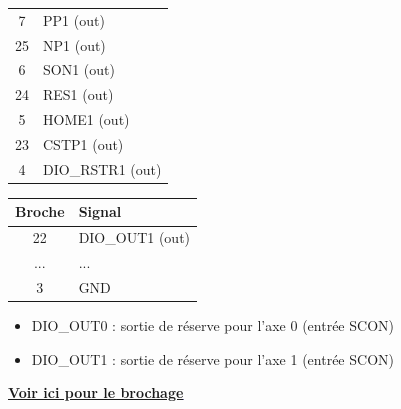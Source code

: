 \documentclass[a4paper,11pt]{beamer}
\begin{document}
\begin{frame}
\begin{table}[htbp]
\begin{tabular}[t]{cl}
    7 & PP1 (out) \\
    25 & NP1 (out)\\
    6 & SON1 (out)\\
    24 & RES1 (out)\\
    5  & HOME1 (out)\\
    23 & CSTP1 (out)\\ 
    4 & DIO\_RSTR1 (out)\\
    \bottomrule
  \end{tabular}
  \hspace{1mm}
  \begin{tabular}[t]{cl}
  \toprule
    \textbf{Broche} & \textbf{Signal} \\
    \midrule
  22 & DIO\_OUT1 (out)\\
    ...			&...\\
    3  & GND \\
    \bottomrule
  \end{tabular}
\end{table}
\begin{itemize}
\tiny
\item DIO\_OUT0 : sortie de réserve pour l'axe 0 (entrée SCON)
\item DIO\_OUT1 : sortie de réserve pour l'axe 1 (entrée SCON)
\end{itemize}
\vspace{0.5cm}
\centering
\textcolor{blue}{\textbf{\underline{\href{https://raw.githubusercontent.com/fbuloup/Interface_IAI/main/Documentation/ProI-HW_eng.pdf\#page=89}{Voir ici pour le brochage}}}}	

\end{frame}
\end{document}
